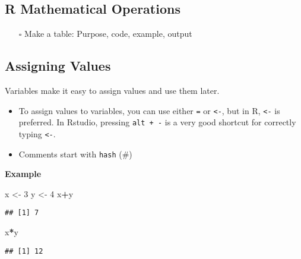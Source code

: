 \documentclass[
]{book}
\newenvironment{Shaded}{\begin{snugshade}}{\end{snugshade}}
\newcommand{\DecValTok}[1]{\textcolor[rgb]{0.00,0.00,0.81}{#1}}
\newcommand{\NormalTok}[1]{#1}
\newcommand{\OperatorTok}[1]{\textcolor[rgb]{0.81,0.36,0.00}{\textbf{#1}}}
\newcommand{\StringTok}[1]{\textcolor[rgb]{0.31,0.60,0.02}{#1}}
\providecommand{\tightlist}{%
  \setlength{\itemsep}{0pt}\setlength{\parskip}{0pt}}
\begin{document}
\hypertarget{r-mathematical-operations}{%
\subsection{R Mathematical Operations}\label{r-mathematical-operations}}

\begin{itemize}
\tightlist
\item[$\square$]
  Make a table: Purpose, code, example, output
\end{itemize}

\hypertarget{assigning-values}{%
\subsection{Assigning Values}\label{assigning-values}}

Variables make it easy to assign values and use them later.

\begin{itemize}
\tightlist
\item
  To assign values to variables, you can use either \texttt{=} or \texttt{\textless{}-}, but in R, \texttt{\textless{}-} is preferred. In Rstudio, pressing \texttt{alt\ +\ -} is a very good shortcut for correctly typing \texttt{\textless{}-}.
\item
  Comments start with \texttt{hash} (\#)
\end{itemize}

\textbf{Example}

\begin{Shaded}
\begin{Highlighting}[]
\NormalTok{x <-}\StringTok{  }\DecValTok{3}
\NormalTok{y <-}\StringTok{  }\DecValTok{4}
\NormalTok{x}\OperatorTok{+}\NormalTok{y}
\end{Highlighting}
\end{Shaded}

\begin{verbatim}
## [1] 7
\end{verbatim}

\begin{Shaded}
\begin{Highlighting}[]
\NormalTok{x}\OperatorTok{*}\NormalTok{y}
\end{Highlighting}
\end{Shaded}

\begin{verbatim}
## [1] 12
\end{verbatim}
\end{document}
